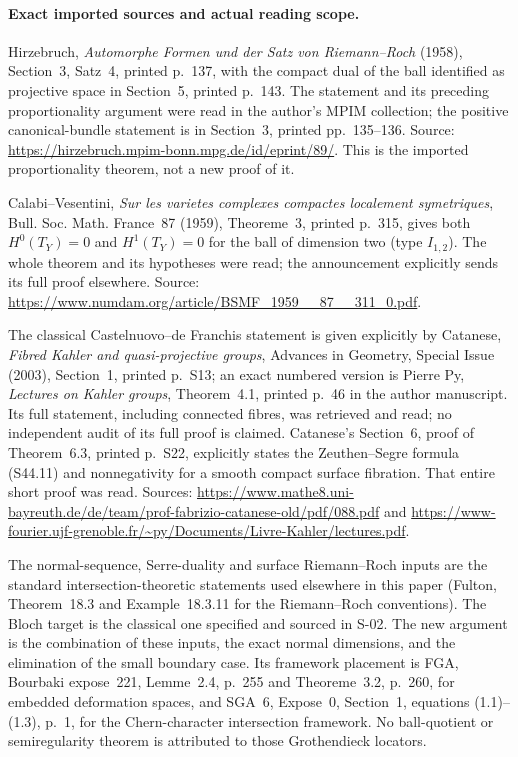 \paragraph{Exact imported sources and actual reading scope.}
Hirzebruch, \emph{Automorphe Formen und der Satz von Riemann--Roch}
(1958), Section~3, Satz~4, printed p.~137, with the compact dual of
the ball identified as projective space in Section~5, printed p.~143.
The statement and its preceding proportionality argument were read
in the author's MPIM collection; the positive canonical-bundle
statement is in Section~3, printed pp.~135--136. Source:
\url{https://hirzebruch.mpim-bonn.mpg.de/id/eprint/89/}.
This is the imported proportionality theorem, not a new proof of it.

Calabi--Vesentini, \emph{Sur les varietes complexes compactes localement
symetriques}, Bull. Soc. Math. France~87 (1959), Theoreme~3,
printed p.~315, gives both $H^0(T_Y)=0$ and $H^1(T_Y)=0$ for the
ball of dimension two (type $I_{1,2}$). The whole theorem and its
hypotheses were read; the announcement explicitly sends its full
proof elsewhere. Source:
\url{https://www.numdam.org/article/BSMF_1959__87__311_0.pdf}.

The classical Castelnuovo--de Franchis statement is given explicitly
by Catanese, \emph{Fibred Kahler and quasi-projective groups},
Advances in Geometry, Special Issue (2003), Section~1, printed p.~S13;
an exact numbered version is Pierre Py, \emph{Lectures on Kahler
groups}, Theorem~4.1, printed p.~46 in the author manuscript. Its full
statement, including connected fibres, was retrieved and read; no
independent audit of its full proof is claimed. Catanese's Section~6,
proof of Theorem~6.3, printed p.~S22, explicitly states the
Zeuthen--Segre formula (S44.11) and nonnegativity for a smooth compact
surface fibration. That entire short proof was read. Sources:
\url{https://www.mathe8.uni-bayreuth.de/de/team/prof-fabrizio-catanese-old/pdf/088.pdf}
and
\url{https://www-fourier.ujf-grenoble.fr/~py/Documents/Livre-Kahler/lectures.pdf}.

The normal-sequence, Serre-duality and surface Riemann--Roch inputs
are the standard intersection-theoretic statements used elsewhere in
this paper (Fulton, Theorem~18.3 and Example~18.3.11 for the
Riemann--Roch conventions). The Bloch target is the classical one
specified and sourced in S-02. The new argument is the combination
of these inputs, the exact normal dimensions, and the elimination
of the small boundary case. Its framework placement is FGA,
Bourbaki expose~221, Lemme~2.4, p.~255 and Theoreme~3.2, p.~260,
for embedded deformation spaces, and SGA~6, Expose~0, Section~1,
equations (1.1)--(1.3), p.~1, for the Chern-character intersection
framework. No ball-quotient or semiregularity theorem is attributed
to those Grothendieck locators.
